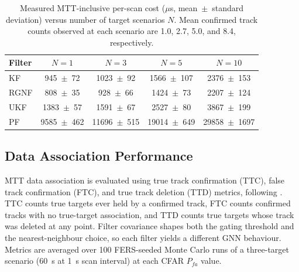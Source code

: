 \documentclass[conference]{IEEEtran}
\begin{document}
\begin{table}[t]
\centering
\caption{Measured MTT-inclusive per-scan cost ($\mu$s, mean~$\pm$~standard deviation) versus number of target scenarios
$N$. Mean confirmed track counts observed at each scenario are 1.0, 2.7, 5.0, and 8.4, respectively.}
\label{tab:comp_scaling}
\begin{tabular*}{\columnwidth}{@{\extracolsep{\fill}}lcccc@{}}
  \toprule
  \textbf{Filter} & $N{=}1$ & $N{=}3$ & $N{=}5$ & $N{=}10$ \\
  \midrule
  KF   &   945~$\pm$~72   &  1023~$\pm$~92   &  1566~$\pm$~107  &  2376~$\pm$~153  \\
  RGNF &   808~$\pm$~35   &   928~$\pm$~66   &  1424~$\pm$~73   &  2207~$\pm$~124  \\
  UKF  &  1383~$\pm$~57   &  1591~$\pm$~67   &  2527~$\pm$~80   &  3867~$\pm$~199  \\
  PF   &  9585~$\pm$~462  & 11696~$\pm$~515  & 19014~$\pm$~649  & 29858~$\pm$~1697 \\
  \bottomrule
\end{tabular*}
\end{table}
  



\subsection{Data Association Performance}

MTT data association is evaluated using true track confirmation (TTC), false track confirmation (FTC), and true track deletion (TTD) metrics, following \cite{kennedy2014powerful}. TTC counts true targets ever held by a confirmed track, FTC counts confirmed tracks with no true-target association, and TTD counts true targets whose track was deleted at any point. Filter covariance shapes both the gating threshold and the nearest-neighbour choice, so each filter yields a different GNN behaviour. Metrics are averaged over 100 FERS-seeded Monte Carlo runs of a three-target scenario (60~s at 1~s scan interval) at each CFAR $P_{fa}$ value.
\end{document}
